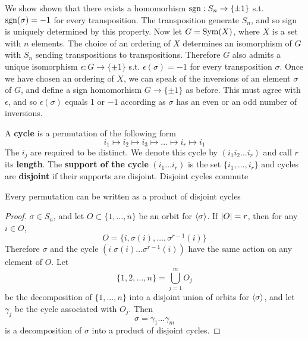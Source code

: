 \documentclass[11pt]{article}
\begin{document}
\begin{remark}
We show shown that there exists a homomorhism \(\operatorname{sgn}:S_n\to\{\pm 1\}\) s.t. \(\operatorname{sgn}(\sigma)=-1\) for every
transposition. The transposition generate \(S_n\), and so sign is uniquely determined by this
property. Now let \(G=\operatorname{Sym}(X)\), where \(X\) is a set with \(n\) elements. The choice of an
ordering of \(X\) determines an isomorphism of \(G\) with \(S_n\) sending transpositions to
transpositions. Therefore \(G\) also admits a unique isomorphism \(\epsilon:G\to\{\pm 1\}\) s.t. \(\epsilon(\sigma)=-1\)
for every transposition \(\sigma\). Once we have chosen an ordering of \(X\), we can speak of the
inversions of an element \(\sigma\) of \(G\), and define a sign homomorhism \(G\to\{\pm 1\}\) as before. This
must agree with \(\epsilon\), and so \(\epsilon(\sigma)\) equals 1 or \(-1\) according as \(\sigma\) has an even or an odd
number of inversions.
\end{remark}

A \textbf{cycle} is a permutation of the following form
\begin{equation*}
i_1\mapsto i_2\mapsto i_3\mapsto\dots\mapsto i_r\mapsto i_1
\end{equation*}
The \(i_j\) are required to be distinct. We denote this cycle by \((i_1 i_2\dots i_r)\) and call \(r\)
its \textbf{length}. The \textbf{support of the cycle} \((i_1\dots i_r)\) is the set \(\{i_1,\dots,i_r\}\) and cycles are
\textbf{disjoint} if their supports are disjoint. Disjoint cycles commute

\begin{proposition}[]
Every permutation can be written as a product of disjoint cycles
\end{proposition}

\begin{proof}
\(\sigma\in S_n\), and let \(O\subset\{1,\dots,n\}\) be an orbit for \(\langle\sigma\rangle\). If \(\abs{O}=r\), then for
any \(i\in O\),
\begin{equation*}
O=\{i,\sigma(i),\dots,\sigma^{r-1}(i)\}
\end{equation*}
Therefore \(\sigma\) and the cycle \((i\;\sigma(i)\dots\sigma^{r-1}(i))\) have the same action on any element of \(O\).
Let
\begin{equation*}
\{1,2,\dots,n\}=\bigcup_{j=1}^mO_j
\end{equation*}
be the decomposition of \(\{1,\dots,n\}\) into a disjoint union of orbits for \(\langle\sigma\rangle\), and let \(\gamma_j\)
be the cycle associated with \(O_j\). Then
\begin{equation*}
\sigma=\gamma_1\dots\gamma_m
\end{equation*}
is a decomposition of \(\sigma\) into a product of disjoint cycles.
\end{proof}
\end{document}

